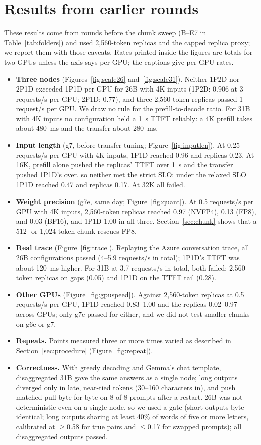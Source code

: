 \documentclass[11pt]{article}
\begin{document}
\section{Results from earlier rounds}\label{app:other}
These results come from rounds before the chunk sweep (B--E7 in Table~\ref{tab:folders}) and used 2,560-token replicas and the capped replica proxy; we report them with those caveats. Rates printed inside the figures are totals for two GPUs unless the axis says per GPU; the captions give per-GPU rates.
\begin{itemize}
  \item \textbf{Three nodes} (Figures~\ref{fig:scale26} and~\ref{fig:scale31}). Neither 1P2D nor 2P1D exceeded 1P1D per GPU for 26B with 4K inputs (1P2D: 0.906 at 3 requests/s per GPU; 2P1D: 0.77), and three 2,560-token replicas passed 1 request/s per GPU. We draw no rule for the prefill-to-decode ratio. For 31B with 4K inputs no configuration held a 1~s TTFT reliably: a 4K prefill takes about 480~ms and the transfer about 280~ms.
  \item \textbf{Input length} (g7, before transfer tuning; Figure~\ref{fig:inputlen}). At 0.25 requests/s per GPU with 4K inputs, 1P1D reached 0.96 and replicas 0.23. At 16K, prefill alone pushed the replicas' TTFT over 1~s and the transfer pushed 1P1D's over, so neither met the strict SLO; under the relaxed SLO 1P1D reached 0.47 and replicas 0.17. At 32K all failed.
  \item \textbf{Weight precision} (g7e, same day; Figure~\ref{fig:quant}). At 0.5 requests/s per GPU with 4K inputs, 2,560-token replicas reached 0.97 (NVFP4), 0.13 (FP8), and 0.03 (BF16), and 1P1D 1.00 in all three. Section~\ref{sec:chunk} shows that a 512- or 1,024-token chunk rescues FP8.
  \item \textbf{Real trace} (Figure~\ref{fig:trace}). Replaying the Azure conversation trace, all 26B configurations passed (4--5.9 requests/s in total); 1P1D's TTFT was about 120~ms higher. For 31B at 3.7 requests/s in total, both failed: 2,560-token replicas on gaps (0.05) and 1P1D on the TTFT tail (0.28).
  \item \textbf{Other GPUs} (Figure~\ref{fig:gpuspeed}). Against 2,560-token replicas at 0.5 requests/s per GPU, 1P1D reached 0.83--1.00 and the replicas 0.02--0.97 across GPUs; only g7e passed for either, and we did not test smaller chunks on g6e or g7.
  \item \textbf{Repeats.} Points measured three or more times varied as described in Section~\ref{sec:procedure} (Figure~\ref{fig:repeat}).
  \item \textbf{Correctness.} With greedy decoding and Gemma's chat template, disaggregated 31B gave the same answers as a single node; long outputs diverged only in late, near-tied tokens (30--160 characters in), and push matched pull byte for byte on 8 of 8 prompts after a restart. 26B was not deterministic even on a single node, so we used a gate (short outputs byte-identical; long outputs sharing at least 40\% of words of five or more letters, calibrated at $\ge$0.58 for true pairs and $\le$0.17 for swapped prompts); all disaggregated outputs passed.
\end{itemize}
\end{document}
